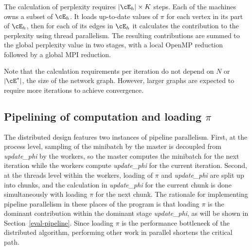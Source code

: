 The calculation of perplexity requires $|\cE_h|\times K$ steps. Each of the
machines owns a subset of $\cE_h$. It loads up-to-date values of $\pi$ for each
vertex in its part of $\cE_h$, then for each of its edges in $\cE_h$ it calculates the
contribution to the perplexity using thread parallelism. The resulting
contributions are summed to the global perplexity value in two stages,
with a local OpenMP reduction followed by a global MPI reduction.

Note that the calculation requirements per iteration do not depend
on $N$ or $|\cE^*|$, the size of the network graph. However, larger graphs are
expected to require more iterations to achieve convergence.

\subsection{Pipelining of computation and loading $\pi$}
\label{sec-pipelining}

The distributed design features two instances of pipeline parallelism. First,
at the process level, sampling of the minibatch by the master is decoupled
from \textit{update\_phi} by the workers, so the master computes the minibatch
for the next iteration while the workers compute \textit{update\_phi} for the
current iteration. Second, at the threads level within the workers, loading of
$\pi$ and \textit{update\_phi} are split up into chunks, and the calculation
in \textit{update\_phi} for the current chunk is done simultaneously with
loading $\pi$ for the next chunk. The rationale for implementing pipeline
parallelism in these places of the program is that loading $\pi$ is the
dominant contribution within the dominant stage \textit{update\_phi}, as
will be shown in Section~\ref{eval-pipeline}.  Since loading $\pi$ is the
performance bottleneck of the distributed algorithm, performing other work
in parallel shortens the critical path.
